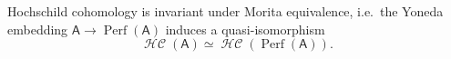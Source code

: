 \documentclass[a4paper]{amsart}
\theoremstyle{plain}
\newtheorem{thm}{Theorem}[section]
\newtheorem{cor}[thm]{Corollary}
\theoremstyle{definition}
\theoremstyle{remark}
\DeclareMathOperator{\Cof}{Cof}
\DeclareMathOperator{\D}{D}
\DeclareMathOperator{\HHc}{\mathcal{HC}}
\DeclareMathOperator{\Ho}{Ho}
\DeclareMathOperator{\Perf}{Perf}
\newcommand{\op}{\mathrm{op}}
\newcommand{\cat}[1]{\mathsf{#1}}
\newcommand{\dgm}{\cat{Mod}\textrm{-}}
\newcommand{\DGMod}[2][]{%
	\ifthenelse{\equal{#1}{}}{\dgm #2}{#1\textrm{-}\dgm #2}%
} %
\numberwithin{equation}{section}
\theoremstyle{plain}
\begin{document}
Hochschild cohomology is invariant under Morita equivalence, i.e.\
 the Yoneda embedding $\cat{A} \to \Perf(\cat{A})$ induces a quasi-isomorphism 
\[
\HHc(\cat{A}) \simeq \HHc(\Perf(\cat{A})).
\]
%	
%		
%	
%	
	
\end{document}
